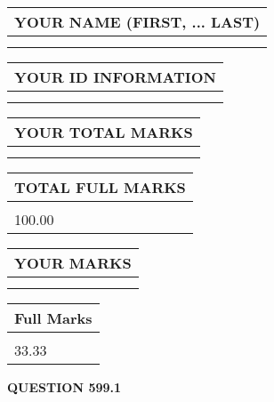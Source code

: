 \documentclass{ctexart}
\begin{document}
   
   
   
\newpage 
\setcounter{page}{ 
   599001 } 
   
   
   
   
\noindent\begin{tabular}{|l|}
\hline
YOUR NAME (FIRST, ... LAST)  \\
\hline
 \\ 
 \\ 
\hline
\end{tabular}
\hspace{0.05in} \begin{tabular}{|l|}
\hline
 YOUR   ID   INFORMATION  \\
\hline
 \\ 
 \\ 
\hline
\end{tabular}
   
   
\vspace{0.2in}\noindent\begin{tabular}{|l|}
\hline
YOUR TOTAL MARKS  \\
\hline
 \\ 
 \\ 
\hline
\end{tabular}
\hspace{0.05in} \begin{tabular}{|l|}
\hline
TOTAL FULL MARKS  \\
\hline
 \\ 
100.00 \\
\hline
\end{tabular}
   
   
 \vspace{0.2in}
 
 
 
 
   
   
  
\vspace{0.2in}
  
\noindent\begin{tabular}{|l|}
\hline
 YOUR MARKS  \\
\hline
 \\ 
 \\ 
\hline
\end{tabular}
\hspace{0.05in} \begin{tabular}{|l|}
\hline
 Full Marks  \\
\hline
 \\ 
33.33 \\
\hline
\end{tabular}
{\textbf{\Large{QUESTION
599.1 
}}}
  
\end{document}
